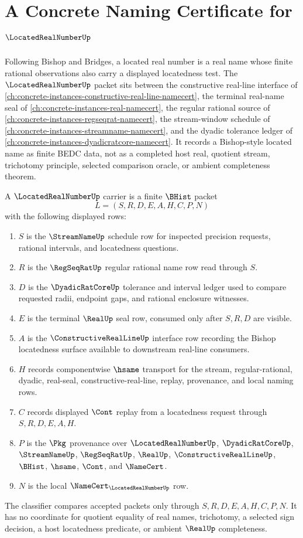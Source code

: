 \chapter{A Concrete Naming Certificate for $\LocatedRealNumberUp$}
\label{ch:concrete-instances-located-real-number-namecert}

Following Bishop and Bridges, a located real number is a real name whose finite rational observations also carry a displayed locatedness test. The $\LocatedRealNumberUp$ packet sits between the constructive real-line interface of \autoref{ch:concrete-instances-constructive-real-line-namecert}, the terminal real-name seal of \autoref{ch:concrete-instances-real-namecert}, the regular rational source of \autoref{ch:concrete-instances-regseqrat-namecert}, the stream-window schedule of \autoref{ch:concrete-instances-streamname-namecert}, and the dyadic tolerance ledger of \autoref{ch:concrete-instances-dyadicratcore-namecert}. It records a Bishop-style located name as finite BEDC data, not as a completed host real, quotient stream, trichotomy principle, selected comparison oracle, or ambient completeness theorem.

\begin{definition}
\label{def:located-real-number-carrier}
A $\LocatedRealNumberUp$ carrier is a finite $\BHist$ packet
$$
L=(S,R,D,E,A,H,C,P,N)
$$
with the following displayed rows:
\begin{enumerate}
\item $S$ is the $\StreamNameUp$ schedule row for inspected precision requests, rational intervals, and locatedness questions.
\item $R$ is the $\RegSeqRatUp$ regular rational name row read through $S$.
\item $D$ is the $\DyadicRatCoreUp$ tolerance and interval ledger used to compare requested radii, endpoint gaps, and rational enclosure witnesses.
\item $E$ is the terminal $\RealUp$ seal row, consumed only after $S,R,D$ are visible.
\item $A$ is the $\ConstructiveRealLineUp$ interface row recording the Bishop locatedness surface available to downstream real-line consumers.
\item $H$ records componentwise $\hsame$ transport for the stream, regular-rational, dyadic, real-seal, constructive-real-line, replay, provenance, and local naming rows.
\item $C$ records displayed $\Cont$ replay from a locatedness request through $S,R,D,E,A,H$.
\item $P$ is the $\Pkg$ provenance over $\LocatedRealNumberUp$, $\DyadicRatCoreUp$, $\StreamNameUp$, $\RegSeqRatUp$, $\RealUp$, $\ConstructiveRealLineUp$, $\BHist$, $\hsame$, $\Cont$, and $\NameCert$.
\item $N$ is the local $\NameCert_{\LocatedRealNumberUp}$ row.
\end{enumerate}
The classifier compares accepted packets only through $S,R,D,E,A,H,C,P,N$. It has no coordinate for quotient equality of real names, trichotomy, a selected sign decision, a host locatedness predicate, or ambient $\RealUp$ completeness.
\end{definition}

